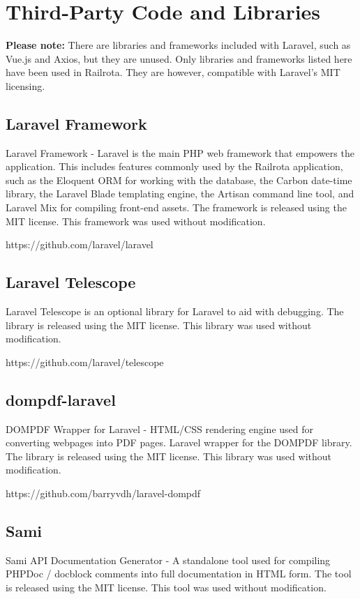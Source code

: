 \chapter{Third-Party Code and Libraries}

\textbf{Please note: } There are libraries and frameworks included with Laravel, such as Vue.js and Axios, but they are unused. Only libraries and frameworks listed here have been used in Railrota. They are however, compatible with Laravel's MIT licensing.

\section{Laravel Framework}
Laravel Framework - Laravel is the main PHP web framework that empowers the application. This includes features commonly used by the Railrota application, such as the Eloquent ORM for working with the database, the Carbon date-time library, the Laravel Blade templating engine, the Artisan command line tool, and Laravel Mix for compiling front-end assets. The framework is released using the MIT license. This framework was used without modification. 

https://github.com/laravel/laravel

\section{Laravel Telescope}
Laravel Telescope is an optional library for Laravel to aid with debugging. The library is released using the MIT license. This library was used without modification.

https://github.com/laravel/telescope

\section{dompdf-laravel}
DOMPDF Wrapper for Laravel - HTML/CSS rendering engine used for converting webpages into PDF pages. Laravel wrapper for the DOMPDF library. The library is released using the MIT license. This library was used without modification.

https://github.com/barryvdh/laravel-dompdf

\section{Sami}
Sami API Documentation Generator - A standalone tool used for compiling PHPDoc / docblock comments into full documentation in HTML form. The tool is released using the MIT license. This tool was used without modification.

